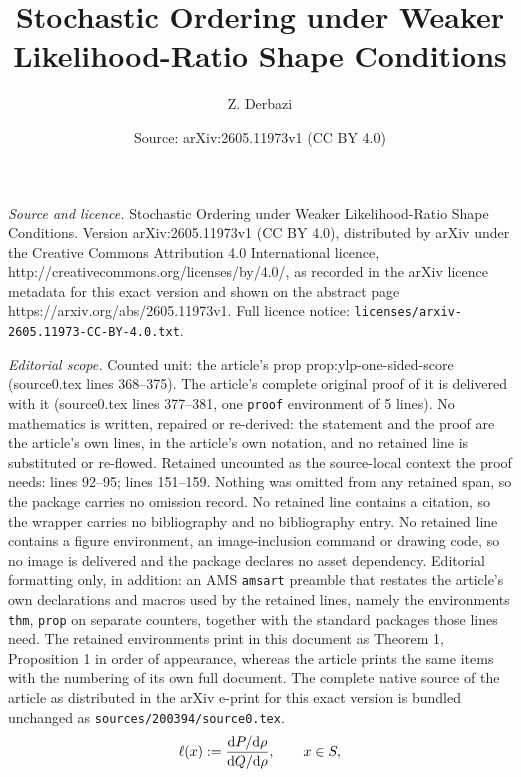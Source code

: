 \documentclass[10pt,a4paper]{amsart}
\title{Stochastic Ordering under Weaker Likelihood-Ratio Shape Conditions}
\author{Z. Derbazi}
\date{Source: arXiv:2605.11973v1 (CC BY 4.0)}
\newcommand{\dx}[1][x]{%
	\ensuremath{
		{\mathrm{d}}{#1}
	}
}
\begin{document}
\maketitle

\noindent\emph{Source and licence.} Stochastic Ordering under Weaker Likelihood-Ratio Shape Conditions. Version arXiv:2605.11973v1 (CC BY 4.0), distributed by arXiv under the Creative Commons Attribution 4.0 International licence, http://creativecommons.org/licenses/by/4.0/, as recorded in the arXiv licence metadata for this exact version and shown on the abstract page https://arxiv.org/abs/2605.11973v1. Full licence notice: \texttt{licenses/arxiv-2605.11973-CC-BY-4.0.txt}.\par\smallskip

\noindent\textit{Editorial scope.} Counted unit: the article's prop prop:ylp-one-sided-score (source0.tex lines 368--375). The article's complete original proof of it is delivered with it (source0.tex lines 377--381, one \texttt{proof} environment of 5 lines). No mathematics is written, repaired or re-derived: the statement and the proof are the article's own lines, in the article's own notation, and no retained line is substituted or re-flowed.  Retained uncounted as the source-local context the proof needs: lines 92--95; lines 151--159.  Nothing was omitted from any retained span, so the package carries no omission record.  No retained line contains a citation, so the wrapper carries no bibliography and no bibliography entry.  No retained line contains a figure environment, an image-inclusion command or drawing code, so no image is delivered and the package declares no asset dependency.  Editorial formatting only, in addition: an AMS \texttt{amsart} preamble that restates the article's own declarations and macros used by the retained lines, namely the environments \texttt{thm}, \texttt{prop} on separate counters, together with the standard packages those lines need.  The retained environments print in this document as Theorem 1, Proposition 1 in order of appearance, whereas the article prints the same items with the numbering of its own full document.  The complete native source of the article as distributed in the arXiv e-print for this exact version is bundled unchanged as \texttt{sources/200394/source0.tex}.
\begin{equation}
    \label{def.ell}
    \ell(x):=\frac{\dx[]P/\dx[]\rho}{\dx[]Q/\dx[]\rho}, \qquad x\in S,
\end{equation}
\end{document}

